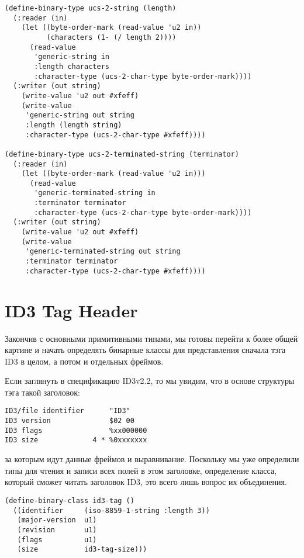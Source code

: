 \begin{lstlisting}
(define-binary-type ucs-2-string (length)
  (:reader (in)
    (let ((byte-order-mark (read-value 'u2 in))
          (characters (1- (/ length 2))))
      (read-value
       'generic-string in
       :length characters
       :character-type (ucs-2-char-type byte-order-mark))))
  (:writer (out string)
    (write-value 'u2 out #xfeff)
    (write-value
     'generic-string out string
     :length (length string)
     :character-type (ucs-2-char-type #xfeff))))

(define-binary-type ucs-2-terminated-string (terminator)
  (:reader (in)
    (let ((byte-order-mark (read-value 'u2 in)))
      (read-value
       'generic-terminated-string in
       :terminator terminator
       :character-type (ucs-2-char-type byte-order-mark))))
  (:writer (out string)
    (write-value 'u2 out #xfeff)
    (write-value 
     'generic-terminated-string out string
     :terminator terminator
     :character-type (ucs-2-char-type #xfeff))))
\end{lstlisting}

\section{ID3 Tag Header}

Закончив с основными примитивными типами, мы готовы перейти к более общей картине и начать
определять бинарные классы для представления сначала тэга ID3 в целом, а потом и отдельных
фреймов.

Если заглянуть в спецификацию ID3v2.2, то мы увидим, что в основе структуры тэга такой заголовок:

\begin{verbatim}
ID3/file identifier      "ID3"
ID3 version              $02 00
ID3 flags                %xx000000
ID3 size             4 * %0xxxxxxx
\end{verbatim}

за которым идут данные фреймов и выравнивание.  Поскольку мы уже определили типы для
чтения и записи всех полей в этом заголовке, определение класса, который сможет читать
заголовок ID3, это всего лишь вопрос их объединения.

\begin{lstlisting}
(define-binary-class id3-tag ()
  ((identifier     (iso-8859-1-string :length 3))
   (major-version  u1)
   (revision       u1)
   (flags          u1)
   (size           id3-tag-size)))
\end{lstlisting}

